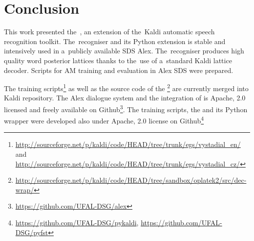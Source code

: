 \chapter{Conclusion}
\label{cha:conclusion}



This work presented the~, an extension of the~Kaldi automatic speech recognition toolkit.
The~recogniser and its Python extension is stable and intensively used in a~publicly available \acl{SDS} Alex\cite{ptics2014url}.
The~recogniser produces high quality word posterior lattices thanks to the~use of a~standard Kaldi lattice decoder.
Scripts for \acl{AM} training and evaluation in Alex \acs{SDS} were prepared.

The training scripts\footnote{\url{http://sourceforge.net/p/kaldi/code/HEAD/tree/trunk/egs/vystadial_en/} and \url{http://sourceforge.net/p/kaldi/code/HEAD/tree/trunk/egs/vystadial_cz/}} as well as 
the source code of the \footnote{\url{http://sourceforge.net/p/kaldi/code/HEAD/tree/sandbox/oplatek2/src/dec-wrap/}} are currently merged into Kaldi repository.
The Alex dialogue system and the integration of  is Apache, 2.0 licensed and freely available on Github\footnote{\url{https://github.com/UFAL-DSG/alex}}.
The training scripts, the  and its Python wrapper  were developed also under Apache, 2.0 license on Github\footnote{\url{https://github.com/UFAL-DSG/pykaldi}, \url{https://github.com/UFAL-DSG/pyfst}} 

